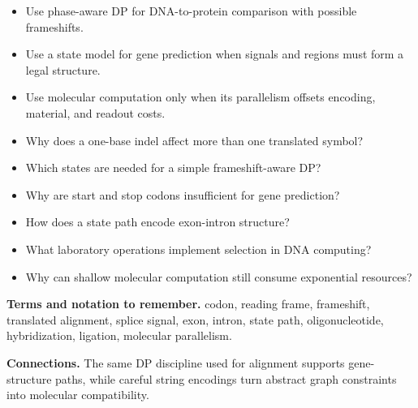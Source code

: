 \documentclass[11pt]{article}
\begin{document}
\begin{tcolorbox}[enhanced,breakable,title={Algorithm selection / when to use this},
  colback=Primary!3,colframe=Primary,fonttitle=\small\sffamily\bfseries,fontupper=\footnotesize,
  boxsep=0.6mm,left=1.5mm,right=1.5mm,top=1mm,bottom=1mm,before skip=3pt,after skip=3pt]
\begin{itemize}
  \item Use phase-aware DP for DNA-to-protein comparison with possible frameshifts.
  \item Use a state model for gene prediction when signals and regions must form a legal structure.
  \item Use molecular computation only when its parallelism offsets encoding, material, and readout costs.
\end{itemize}
\end{tcolorbox}

\begin{tcolorbox}[enhanced,breakable,title={Self-test questions},
  colback=white,colframe=Accent,fonttitle=\small\sffamily\bfseries,fontupper=\footnotesize,
  boxsep=0.6mm,left=1.5mm,right=1.5mm,top=1mm,bottom=1mm,before skip=3pt,after skip=3pt]
\begin{itemize}
  \item Why does a one-base indel affect more than one translated symbol?
  \item Which states are needed for a simple frameshift-aware DP?
  \item Why are start and stop codons insufficient for gene prediction?
  \item How does a state path encode exon-intron structure?
  \item What laboratory operations implement selection in DNA computing?
  \item Why can shallow molecular computation still consume exponential resources?
\end{itemize}
\end{tcolorbox}

{\footnotesize
\textbf{Terms and notation to remember.} codon, reading frame, frameshift, translated alignment, splice signal, exon, intron, state path, oligonucleotide, hybridization, ligation, molecular parallelism.

\textbf{Connections.} The same DP discipline used for alignment supports gene-structure paths, while careful string encodings turn abstract graph constraints into molecular compatibility.
}
\end{document}

